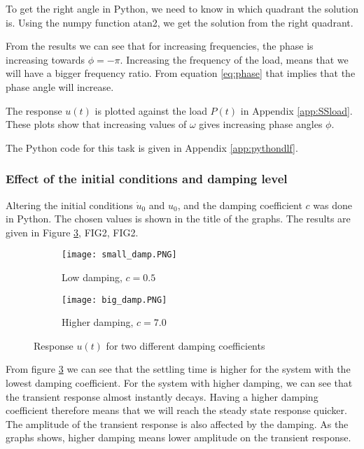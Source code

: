 \documentclass[11pt, a4paper, english, hidelinks]{NTNUoving}
\begin{document}
To get the right angle in Python, we need to know in which quadrant the solution is. Using the numpy function atan2, we get the solution from the right quadrant. 

From the results we can see that for increasing frequencies, the phase is increasing towards $\phi = -\pi$. Increasing the frequency of the load, means that we will have a bigger frequency ratio. From equation \eqref{eq:phase} that implies that the phase angle will increase. 

The response $u(t)$ is plotted against the load $P(t)$ in Appendix \ref{app:SSload}. These plots show that increasing values of $\omega$ gives increasing phase angles $\phi$.

The Python code for this task is given in Appendix \ref{app:pythondlf}. 
\subsubsection*{Effect of the initial conditions and damping level}
Altering the initial conditions $\dot{u}_0$ and $u_0$, and the damping coefficient $c$ was done in Python. The chosen values is shown in the title of the graphs. The results are given in Figure \ref{fig:transientdamping}, FIG2, FIG2.

\begin{figure}
	\begin{subfigure}{.5\textwidth}
		\centering
		\texttt{[image: small\_damp.PNG]}
		\caption{Low damping, $c = 0.5$}
		\label{fig:sfig22}
	\end{subfigure}%
	\begin{subfigure}{.5\textwidth}
		\centering
		\texttt{[image: big\_damp.PNG]}
		\caption{Higher damping, $c = 7.0$}
		\label{fig:sfig23}
	\end{subfigure}
	\caption{Response $u(t)$ for two different damping coefficients}
	\label{fig:transientdamping}
\end{figure}


From figure \ref{fig:transientdamping} we can see that the settling time is higher for the system with the lowest damping coefficient. For the system with higher damping, we can see that the transient response almost instantly decays. Having a higher damping coefficient therefore means that we will reach the steady state response quicker. The amplitude of the transient response is also affected by the damping. As the graphs shows, higher damping means lower amplitude on the transient response.
\end{document}
